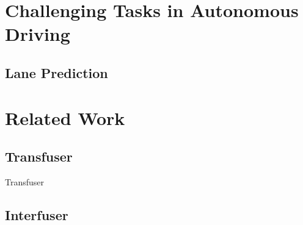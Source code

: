 \section{Challenging Tasks in Autonomous Driving}

\subsection{Lane Prediction}


\section{Related Work}

\subsection{Transfuser}
Transfuser \cite{transfuser-pami} \cite{transfuser-cvpr}

\subsection{Interfuser}
